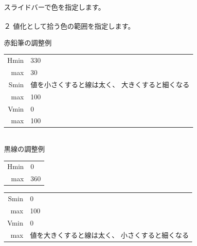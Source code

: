 \documentclass[a4paper,10pt]{article}
\begin{document}
\noindent スライドバーで色を指定します。\\
\\
２ 値化として拾う色の範囲を指定します。\par
赤鉛筆の調整例\\[-1.25em]

\setlength{\tabcolsep}{0em}
\renewcommand{\arraystretch}{1.0}
\hspace{4.0em}\begin{tabular}{rl}
Hmin \hspace{1.0em}  & 330\\
max \hspace{1.0em} & 30\\
Smin \hspace{1.0em} & 値を小さくすると線は太く、 大きくすると細くなる\\
max \hspace{1.0em} & 100\\
Vmin \hspace{1.0em} & 0\\
max \hspace{1.0em} & 100\\
\end{tabular}\\[-0.5em]

黒線の調整例\\[-1.25em]

\setlength{\tabcolsep}{0em}
\renewcommand{\arraystretch}{1.0}
\hspace{4.0em}\begin{tabular}{rl}
Hmin \hspace{1.0em} & 0\\
max \hspace{1.0em} & 360\\
\end{tabular}

\newpage

\setlength{\tabcolsep}{0em}
\renewcommand{\arraystretch}{1.0}
\hspace{4.0em}\begin{tabular}{rl}
Smin \hspace{1.0em} & 0\\
max \hspace{1.0em} & 100\\
Vmin \hspace{1.0em} & 0\\
max \hspace{1.0em} & 値を大きくすると線は太く、 小さくすると細くなる\\
\end{tabular}\\[-0.5em]
\end{document}
